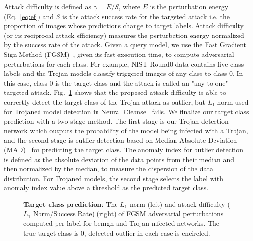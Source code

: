 \documentclass{article}
\begin{document}
Attack difficulty is defined as $\gamma = E/S$,  where $E$ is the perturbation energy (Eq.~\ref{eq:ef}) and $S$ is the attack success rate for the targeted attack i.e. the proportion of images whose predictions change to target labels. Attack difficulty (or its reciprocal attack efficiency) measures the perturbation energy normalized by the success rate of the attack. Given a query model, we use the Fast Gradient Sign Method (FGSM)~\cite{goodfellow2014explaining}, given its fast execution time, to compute adversarial perturbations for each class. For example, NIST-Round0 data contains five class labels 
and the Trojan models classify triggered images of any class to class 0. In this case, class 0 is the target class and the attack is called an "any-to-one" targeted attack.
Fig.~\ref{fig:plots} shows that the proposed attack difficulty is able to correctly detect the target class of the Trojan attack as outlier, but $L_1$ norm used for Trojaned model detection in Neural Cleanse~\cite{wang2019neural} fails. We finalize our target class prediction with a two stage method. The first stage is our Trojan detection network which outputs the probability of the model being infected with a Trojan, and the second stage is outlier detection based on Median Absolute Deviation (MAD)~\cite{hampel1974influence,wang2019neural} for predicting the target class. The anomaly index for outlier detection is defined as the absolute deviation of the data points from their median and then  normalized by the median, to measure the dispersion of the data distribution. For Trojaned models, the second stage selects the label with anomaly index value above a threshold as the predicted target class.  
















\begin{figure}[t]
\centering     {}
\vspace{-3mm}
  \caption{\textbf{Target class prediction:} The $L_1$ norm (left) and attack difficulty ($L_1$ Norm/Success Rate) (right) of FGSM adversarial perturbations computed per label for benign and Trojan infected networks. The true target class is 0, detected outlier in each case is encircled.}
\vspace{-3mm}
\label{fig:plots}
\end{figure}
\end{document}
